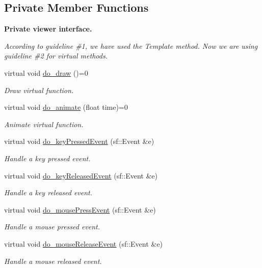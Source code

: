 \subsection*{Private Member Functions}
\begin{Indent}{\bf Private viewer interface.}\par
{\em According to guideline \#1, we have used the Template method. Now we are using guideline \#2 for virtual methods. }\begin{DoxyCompactItemize}
\item 
virtual void \hyperlink{classRenderable_a98ab6308c1d2b56dacda7c435fb38d5b}{do\+\_\+draw} ()=0
\begin{DoxyCompactList}\small\item\em Draw virtual function. \end{DoxyCompactList}\item 
virtual void \hyperlink{classRenderable_aa5206322555c9dece40b21e797629b34}{do\+\_\+animate} (float time)=0
\begin{DoxyCompactList}\small\item\em Animate virtual function. \end{DoxyCompactList}\item 
virtual void \hyperlink{classRenderable_a49e39be950dca7a925b8b79c13241e6b}{do\+\_\+key\+Pressed\+Event} (sf\+::\+Event \&e)
\begin{DoxyCompactList}\small\item\em Handle a key pressed event. \end{DoxyCompactList}\item 
virtual void \hyperlink{classRenderable_a89d4bacd849c3606529f92c44b0a3bc1}{do\+\_\+key\+Released\+Event} (sf\+::\+Event \&e)
\begin{DoxyCompactList}\small\item\em Handle a key released event. \end{DoxyCompactList}\item 
virtual void \hyperlink{classRenderable_a9de3c5f272bbeeb32151056df9384309}{do\+\_\+mouse\+Press\+Event} (sf\+::\+Event \&e)
\begin{DoxyCompactList}\small\item\em Handle a mouse pressed event. \end{DoxyCompactList}\item 
virtual void \hyperlink{classRenderable_adae67d88a7803f445f4d8b81a56cec60}{do\+\_\+mouse\+Release\+Event} (sf\+::\+Event \&e)
\begin{DoxyCompactList}\small\item\em Handle a mouse released event. \end{DoxyCompactList}\item 

\end{DoxyCompactItemize}
\end{Indent}
